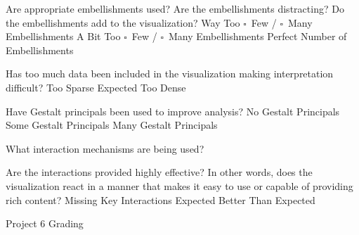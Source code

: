 \documentclass[a4paper,12pt]{article}
\begin{document}
	{Are appropriate embellishments used? Are the embellishments 
    	distracting? Do the embellishments add to the visualization?}
	{Way Too $\square$~Few / $\square$~Many Embellishments}
	{A Bit Too $\square$~Few / $\square$~Many Embellishments}
	{\choice Perfect Number of Embellishments} 
        
	{Has too much data been included in the visualization making 
    	interpretation difficult? } 
	{\choice Too Sparse}
	{\choice Expected}
	{\choice Too Dense} 
        
	{Have Gestalt principals been used to improve analysis?}
	{\choice No Gestalt Principals}
	{\choice Some Gestalt Principals}
	{\choice Many Gestalt Principals} 
        
\EndTable  
 
        
\vspace{15pt}   
 

   	{What interaction mechanisms are being used?}
    {
    }
        
	{Are the interactions provided highly effective? In other words, does 
    	the visualization react in a manner that makes it easy to use or 
        capable of providing rich content?}
    {\choice Missing Key Interactions}
    {\choice Expected}
    {\choice Better Than Expected}
    
\EndTable



\newpage


\begin{center}
{\huge Project 6 Grading}
\end{center}
\end{document}
